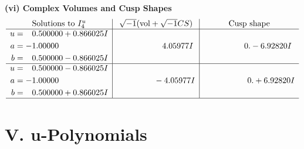 \documentclass[1p]{elsarticle_modified}
\theoremstyle{definition}
\newcommand{\I}{\sqrt{-1}}
\begin{document}
\newpage\flushleft \textbf{(vi) Complex Volumes and Cusp Shapes}
$$\begin{array}{c|c|c}  
\text{Solutions to }I^u_{4}& \I (\text{vol} + \sqrt{-1}CS) & \text{Cusp shape}\\
 \hline 
\begin{aligned}
u &= \phantom{-}0.500000 + 0.866025 I \\
a &= -1.00000\phantom{ +0.000000I} \\
b &= \phantom{-}0.500000 - 0.866025 I\end{aligned}
 & \phantom{-0.000000 -}4.05977 I & \phantom{-0.000000 } 0. - 6.92820 I \\ \hline\begin{aligned}
u &= \phantom{-}0.500000 - 0.866025 I \\
a &= -1.00000\phantom{ +0.000000I} \\
b &= \phantom{-}0.500000 + 0.866025 I\end{aligned}
 & \phantom{-0.000000 } -4.05977 I & \phantom{-0.000000 -}0. + 6.92820 I\\
 \hline 
 \end{array}$$\newpage
\newpage\renewcommand{\arraystretch}{1}
\centering \section*{ V. u-Polynomials}
\end{document}
